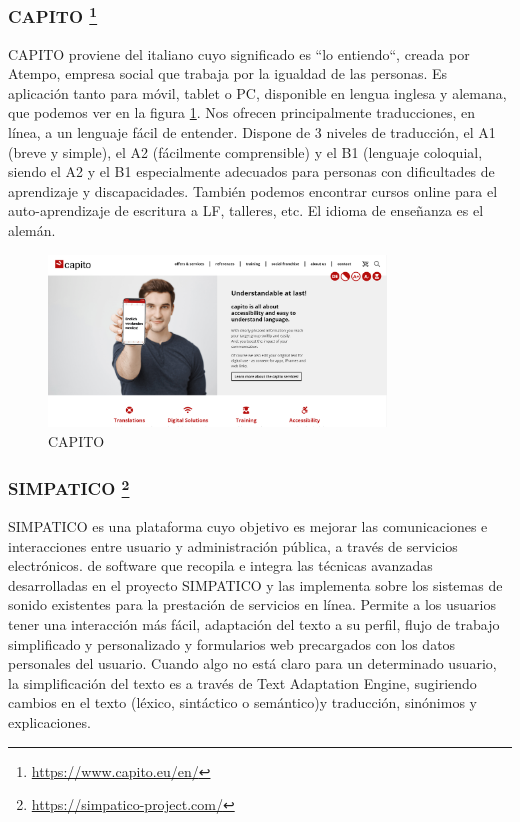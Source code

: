 \subsubsection{CAPITO \footnote{\href{https://www.capito.eu/en/}{https://www.capito.eu/en/}}}

CAPITO proviene del italiano cuyo significado es ``lo entiendo``, creada por Atempo, empresa social que trabaja por la igualdad de las personas. Es aplicación tanto para móvil, tablet o PC, disponible en lengua inglesa y alemana, que podemos ver en la figura \ref{fig:capito}. Nos ofrecen principalmente traducciones, en línea, a un lenguaje fácil de entender. Dispone de 3 niveles de traducción, el A1 (breve y simple), el A2 (fácilmente comprensible) y el B1 (lenguaje coloquial, siendo el A2 y el B1 especialmente adecuados para personas con dificultades de aprendizaje y discapacidades. 
También podemos encontrar cursos online para el auto-aprendizaje de escritura a LF, talleres, etc. El idioma de enseñanza es el alemán.
\begin{figure}[h]
	\centering
	\includegraphics[width=0.8\textwidth]{Imagenes/ProyectosMateriales/capito}
	\caption{CAPITO}
	\label{fig:capito}
\end{figure} 

\newpage
\subsubsection{SIMPATICO \footnote{\href{https://simpatico-project.com/}{https://simpatico-project.com/}}}

SIMPATICO es una plataforma cuyo objetivo es mejorar las comunicaciones e interacciones entre usuario y administración pública, a través de servicios electrónicos.
de software que recopila e integra las técnicas avanzadas desarrolladas en el proyecto SIMPATICO y las implementa sobre los sistemas de sonido 
existentes para la prestación de servicios en línea. Permite a los usuarios tener una interacción más fácil, adaptación del texto a su perfil, flujo de trabajo simplificado y personalizado y formularios web precargados con los datos personales del usuario.
Cuando algo no está claro para un determinado usuario, la simplificación del texto es a través de Text Adaptation Engine, sugiriendo cambios en el texto (léxico, sintáctico o semántico)y traducción, sinónimos y explicaciones. 

